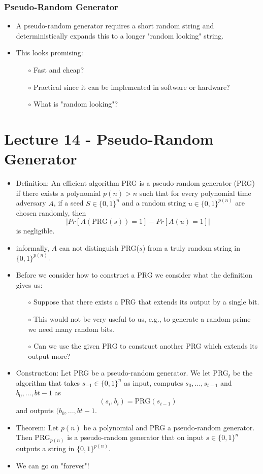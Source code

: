 \documentclass[a4paper]{scrartcl}
\begin{document}
\subsubsection*{Pseudo-Random Generator}

\begin{itemize}
\item A pseudo-random generator requires a short random string and deterministically expands this to a longer "random looking" string. 
\item This looks promising:
\begin{itemize}
\item [$\circ$] Fast and cheap?
\item [$\circ$] Practical since it can be implemented in software or hardware?
\item [$\circ$] What is "random looking"?
\end{itemize}
\end{itemize}

\section*{Lecture 14 - Pseudo-Random Generator}

\begin{itemize}
\item Definition: An efficient algorithm PRG is a pseudo-random generator (PRG) if there exists a polynomial $p(n) > n$ such that for every polynomial time adversary $A$, if a seed $S \in \{0,1\}^n$ and a random string $u \in \{0,1\}^{p(n)}$ are chosen randomly, then $$|Pr[A(\text{PRG}(s)) =1] - Pr[A(u) = 1]|$$ is negligible. 
\item informally, $A$ can not distinguish PRG($s$) from a truly random string in $\{0,1\}^{p(n)}$.
\item Before we consider how to construct a PRG we consider what the definition gives us:
\begin{itemize}
\item [$\circ$] Suppose that there exists a PRG that extends its output by a single bit.
\item [$\circ$] This would not be very useful to us, e.g., to generate a random prime we need many random bits.
\item [$\circ$] Can we use the given PRG to construct another PRG which extends its output more?
\end{itemize}
\item Construction: Let PRG be a pseudo-random generator. We let PRG$_t$ be the algorithm that takes $s_{-1} \in \{0,1\}^n$ as input, computes $s_0, ..., s_{t-1}$ and $b_0,...,b{t-1}$ as $$(s_i,b_i)= \text{PRG}(s_{i-1})$$ and outputs $(b_0,...,b{t-1}$.
\item Theorem: Let $p(n)$ be a polynomial and PRG a pseudo-random generator. Then PRG$_{p(n)}$ is a pseudo-random generator that on input $s \in \{0,1\}^n$ outputs a string in $\{0,1\}^{p(n)}$.
\item We can go on "forever"!
\end{itemize}
\end{document}
